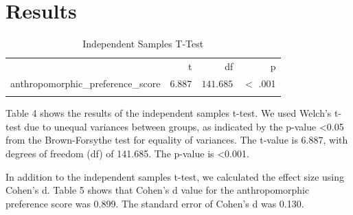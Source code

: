 \documentclass[conference]{IEEEtran}
\begin{document}
\section{Results}
\begin{table}[h]
	\centering
	\caption{Independent Samples T-Test}
	\label{tab:independentSamplesT-Test}
	{
		\begin{tabular}{lrrr}
			\toprule
			$ $ & t & df & p  \\
			\cmidrule[0.4pt]{1-4}
			anthropomorphic\_preference\_score & $6.887$ & $141.685$ & $<$ .001  \\
			\bottomrule
			\addlinespace[1ex]
			\multicolumn{4}{p{0.5\linewidth}}{\textit{Note.} Welch's t-test.} \\
		\end{tabular}
	}
\end{table}

Table 4 shows the results of the independent samples t-test. We used Welch’s t-test due to unequal variances between groups, as indicated by the p-value \textless 0.05 from the Brown-Forsythe test for equality of variances. The t-value is 6.887, with degrees of freedom (df) of 141.685. The p-value is \textless 0.001.               

\begin{table}[h]
    \centering
    \caption{Independent Samples T-Test with Effect Size}
    \label{tab:independentSamplesT-TestCohensD}
\end{table}

In addition to the independent samples t-test, we calculated the effect size using Cohen’s d. Table 5 shows that Cohen’s d value for the anthropomorphic preference score was 0.899. The standard error of Cohen’s d was 0.130.

\begin{table}[h]
    \centering
    \caption{Regression Coefficients Table}
    \label{tab:regressionCoefficientsTable}
\end{table}
\end{document}
